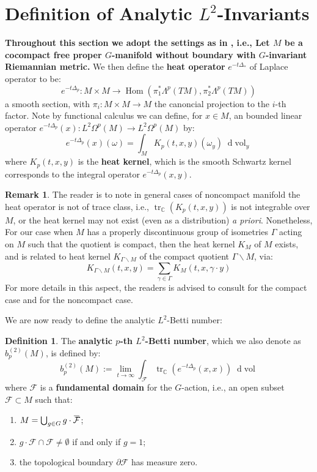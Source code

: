 \documentclass[11pt]{report}
\theoremstyle{definition}
\newtheorem{Def}{Definition}[chapter]
\newtheorem{Rmk}{Remark}[chapter]
\theoremstyle{plain}
\DeclareMathOperator{\tr}{tr}
\DeclareMathOperator{\vol}{vol}
\DeclareMathOperator{\Hom}{Hom}
\newcommand{\complex}{\mathbb{C}}
\newcommand{\overbar}[1]{\mkern 1.5mu\overline{\mkern-1.5mu#1\mkern-1.5mu}\mkern 1.5mu}
\renewcommand{\bar}{\overbar}
\newcommand{\mass}[1]{\mathop{}\mathrm{d}{#1}}
\begin{document}
\section{Definition of Analytic $L^2$-Invariants}\label{def}
\textbf{Throughout this section we adopt the settings as in , i.e., Let $M$ be a cocompact free proper $G$-manifold without boundary with $G$-invariant Riemannian metric.} We then define the \textbf{heat operator} $e^{-t\Delta_*}$ of Laplace operator to be:
\begin{equation}
e^{-t\Delta_p}:M\times M\to \Hom(\pi^*_1\Lambda^p(TM), \pi_2^*\Lambda^p(TM))
\end{equation}
a smooth section, with $\pi_i:M\times M\to M$ the canoncial projection to the $i$-th factor. Note by functional calculus we can define, for $x\in M$, an bounded linear operator $e^{-t\Delta_p}(x):L^2\Omega^p(M)\to L^2\Omega^p(M)$ by:
\begin{equation}
e^{-t\Delta_p}(x)(\omega)=\int_M K_p(t,x,y)(\omega_y)\mass{\vol_y}
\end{equation}
where $K_p(t,x,y)$ is the \textbf{heat kernel}, which is the smooth Schwartz kernel corresponds to the integral operator $e^{-t\Delta_p}(x,y)$.
\begin{Rmk}
	The reader is to note in general cases of noncompact manifold the heat operator is not of trace class, i.e., $\tr_\complex(K_p(t,x,y))$ is not integrable over $M$, or the heat kernel may not exist (even as a distribution) \textit{a priori}. Nonetheless, For our case when $M$ has a properly discontinuous group of isometries $\Gamma$ acting on $M$ such that the quotient is compact, then the heat kernel $K_M$ of $M$ exists, and is related to heat kernel $K_{\Gamma\backslash M}$ of the compact quotient $\Gamma\backslash M$, via:
	\begin{equation}
	K_{\Gamma\backslash M}(t, x, y)=\sum_{\gamma\in \Gamma}K_M(t, x, \gamma\cdot y)
	\end{equation}
	For more details in this aspect, the readers is advised to consult \cite[Chapter VI.4]{chavel1984} for the compact case and \cite{donnelly1979} for the noncompact case.
\end{Rmk}
We are now ready to define the analytic $L^2$-Betti number:
\begin{Def}\label{1.60}
	The \textbf{analytic $p$-th $L^2$-Betti number}, which we also denote as $b_p^{(2)}(M)$, is defined by:
		\begin{equation}
		b^{(2)}_p(M):=\lim_{t\to \infty}\int_{\mathcal{F}}\tr_{\complex}(e^{-t\Delta_p}(x,x))\mass{\vol}
		\end{equation}
		where $\mathcal{F}$ is a \textbf{fundamental domain} for the $G$-action, i.e., an open subset $\mathcal{F}\subset M$ such that: \begin{enumerate}
			\item $M=\bigcup_{g\in G}g\cdot \bar{\mathcal{F}}$;
			\item $g\cdot \mathcal{F}\cap \mathcal{F}\neq \emptyset$ if and only if $g=1$;
			\item  the topological boundary $\partial \mathcal{F}$ has measure zero.
		\end{enumerate}
\end{Def}
\end{document}
